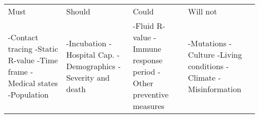 \begin{center}

\begin{tabularx}{0.9\textwidth} { 
  | >{\raggedright\arraybackslash}X 
  | >{\raggedright\arraybackslash}X 
  | >{\raggedright\arraybackslash}X
  | >{\raggedright\arraybackslash}X| }

 \hline
 \multicolumn{4}{|c|}{Simulation} \\
 \hline
  Must &  Should & Could & Will not \\
 \hline
   -Contact tracing \newline -Static R-value \newline -Time frame \newline -Medical states \newline -Population 
 
 & -Incubation \newline -Hospital Cap. \newline -Demographics \newline -Severity and death
 
 & -Fluid R-value \newline -Immune response period \newline -Other preventive measures
 
 & -Mutations \newline -Culture \newline -Living conditions \newline -Climate \newline -Misinformation \\
 
\hline
\end{tabularx}

\end{center}